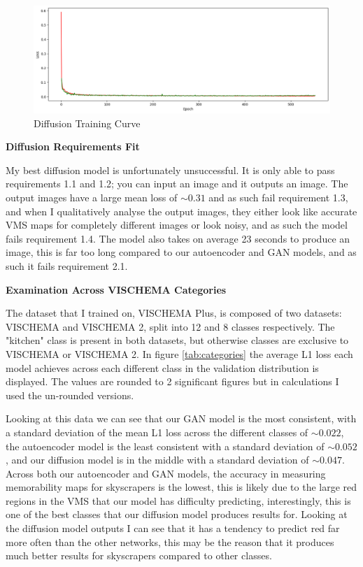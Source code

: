 \documentclass{UoYCSproject}
\begin{document}
\begin{figure}[ht]
    \centering
    \includegraphics[width=\linewidth]{Diffusion training curve}
    \caption{Diffusion Training Curve}
    \label{fig:DiffusionTraining}
\end{figure}

\textbf{Diffusion Requirements Fit}

My best diffusion model is unfortunately unsuccessful. It is only able to pass requirements 1.1 and 1.2; you can input an image and it outputs an image. The output images have a large mean loss of \( \sim 0.31 \) and as such fail requirement 1.3, and when I qualitatively analyse the output images, they either look like accurate VMS maps for completely different images or look noisy, and as such the model fails requirement 1.4. The model also takes on average 23 seconds to produce an image, this is far too long compared to our autoencoder and GAN models, and as such it fails requirement 2.1. 

\textbf{Examination Across VISCHEMA Categories}

The dataset that I trained on, VISCHEMA Plus, is composed of two datasets: VISCHEMA and VISCHEMA 2, split into 12 and 8 classes respectively. The "kitchen" class is present in both datasets, but otherwise classes are exclusive to VISCHEMA or VISCHEMA 2. In figure \ref{tab:categories} the average L1 loss each model achieves across each different class in the validation distribution is displayed. The values are rounded to 2 significant figures but in calculations I used the un-rounded versions. 

Looking at this data we can see that our GAN model is the most consistent, with a standard deviation of the mean L1 loss across the different classes of \( \sim 0.022\), the autoencoder model is the least consistent with a standard deviation of \( \sim 0.052\), and our diffusion model is in the middle with a standard deviation of \( \sim 0.047\). Across both our autoencoder and GAN models, the accuracy in measuring memorability maps for skyscrapers is the lowest, this is likely due to the large red regions in the VMS that our model has difficulty predicting, interestingly, this is one of the best classes that our diffusion model produces results for. Looking at the diffusion model outputs I can see that it has a tendency to predict red far more often than the other networks, this may be the reason that it produces much better results for skyscrapers compared to other classes.
\end{document}
